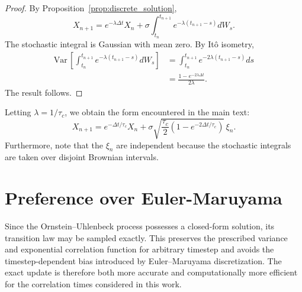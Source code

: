 \documentclass[12pt,reqno]{amsart}
\theoremstyle{plain}
\begin{document}
\begin{proof}
    By Proposition~\ref{prop:discrete_solution},
    \begin{equation*}
        X_{n+1} = e^{-\lambda \Delta t} X_n + \sigma \int_{t_n}^{t_{n+1}} e^{-\lambda (t_{n+1}-s)} dW_s.
    \end{equation*}
    The stochastic integral is Gaussian with mean zero. By Itô isometry,
    \begin{align*}
        \mathrm{Var}\,\left[\int_{t_n}^{t_{n+1}} e^{-\lambda (t_{n+1}-s)} dW_s\right] &= \int_{t_n}^{t_{n+1}} e^{-2\lambda (t_{n+1}-s)} ds\\
        &= \frac{1-e^{-2\lambda\Delta t}}{2\lambda}.
    \end{align*}
    The result follows.
\end{proof}

Letting $\lambda = 1/\tau_c$, we obtain the form encountered in the main text:
\begin{equation*}
    X_{n+1} = e^{-\Delta t/\tau_c} X_n + \sigma \sqrt{\frac{\tau_c}{2}\left(1-e^{-2\Delta t/\tau_c}\right)}\,\xi_n.
\end{equation*}
Furthermore, note that the $\xi_n$ are independent because the stochastic integrals are taken over disjoint Brownian intervals.

\section{Preference over Euler-Maruyama}
Since the Ornstein–Uhlenbeck process possesses a closed-form solution, its transition law may be sampled exactly. This preserves the prescribed variance and exponential correlation function for arbitrary timestep and avoids the timestep-dependent bias introduced by Euler–Maruyama discretization. The exact update is therefore both more accurate and computationally more efficient for the correlation times considered in this work.
\end{document}

